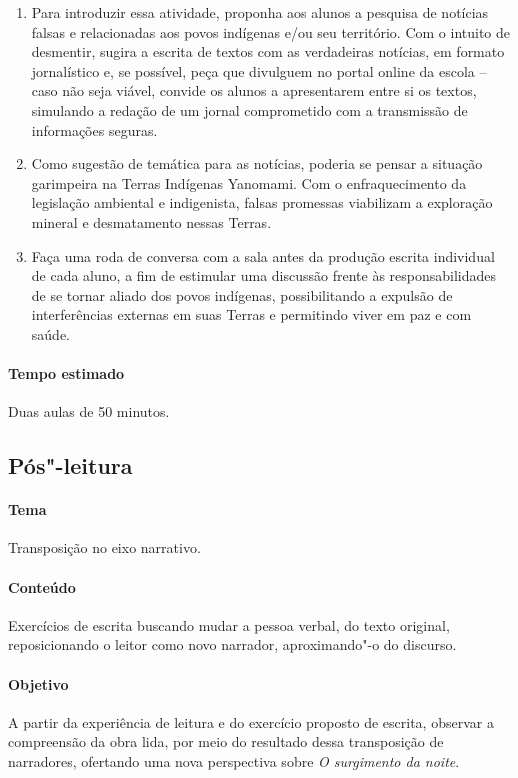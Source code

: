 \documentclass[12pt]{extarticle}
\begin{document}
\begin{enumerate}
\item Para introduzir essa atividade, proponha aos alunos a pesquisa de notícias falsas e relacionadas
aos povos indígenas e/ou seu território. Com o intuito de desmentir, sugira a escrita de textos
com as verdadeiras notícias, em formato jornalístico e, se possível, peça que divulguem no
portal online da escola – caso não seja viável, convide os alunos a apresentarem entre si os textos, 
simulando a redação de um jornal comprometido com a transmissão de informações seguras.  

\item Como sugestão de temática para as notícias, poderia se pensar a situação garimpeira na Terras
Indígenas Yanomami. Com o enfraquecimento da legislação ambiental e indigenista, falsas promessas
viabilizam a exploração mineral e desmatamento nessas Terras.

\item Faça uma roda de conversa com a sala antes da produção escrita individual de cada aluno, a fim de
estimular uma discussão frente às responsabilidades de se tornar aliado dos povos indígenas, possibilitando a expulsão de interferências externas em suas Terras e permitindo viver em paz e com saúde.
\end{enumerate}


\paragraph{Tempo estimado} Duas aulas de 50 minutos.


\subsection{Pós"-leitura}

\paragraph{Tema} Transposição no eixo narrativo.

\paragraph{Conteúdo} Exercícios de escrita buscando mudar a pessoa verbal, 
do texto original, reposicionando o leitor como novo narrador, aproximando"-o
do discurso.

\paragraph{Objetivo} A partir da experiência de leitura e do exercício proposto
de escrita, observar a compreensão da obra lida, por meio do resultado dessa 
transposição de narradores, ofertando uma nova perspectiva sobre \textit{O surgimento da noite}. 
\end{document}
